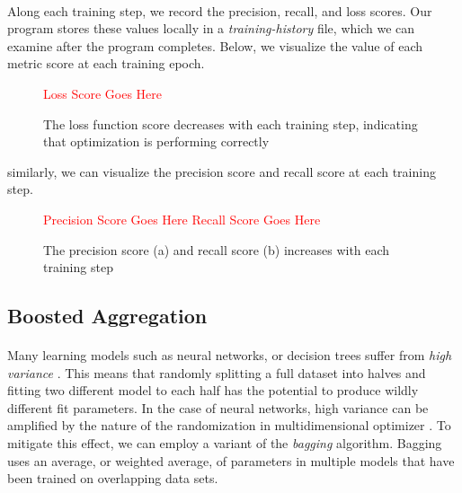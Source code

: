 \documentclass[12pt,letterpaper]{article}
\begin{document}
\paragraph*{}Along each training step, we record the precision, recall, and loss scores. Our program stores these values locally in a \textit{training-history} file, which we can examine after the program completes. Below, we visualize the value of each metric score at each training epoch. 

\begin{figure}[h]
\begin{center}
\textcolor{red}{Loss Score Goes Here}
\end{center}
\caption{The loss function score decreases with each training step, indicating that optimization is performing correctly}
\label{fig-LossScore}
\end{figure}

similarly, we can visualize the precision score and recall score at each training step.

\begin{figure}[h]
\begin{center}
\textcolor{red}{Precision Score Goes Here}
\textcolor{red}{Recall Score Goes Here}
\end{center}
\caption{The precision score (a) and recall score (b) increases with each training step}
\label{fig-PrecisionRecallScores}
\end{figure}


\subsection{Boosted Aggregation}
\label{subsec-Bagging}

\paragraph*{}Many learning models such as neural networks, or decision trees suffer from \textit{high variance} \cite{James}. This means that randomly splitting a full dataset into halves and fitting two different model to each half has the potential to produce wildly different fit parameters. In the case of neural networks, high variance can be amplified by the nature of the randomization in multidimensional optimizer \cite{Geron}. To mitigate this effect, we can employ a variant of the \textit{bagging} algorithm. Bagging uses an average, or weighted average, of parameters in multiple models that have been trained on overlapping data sets.
\end{document}
